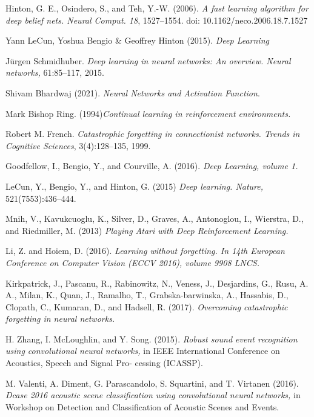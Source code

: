 \documentclass[english, LaM, oneside]{sapthesis}%
\begin{document}
\backmatter
{}
\begin{thebibliography}{17}

Hinton, G. E., Osindero, S., and Teh, Y.-W. (2006). \textit{A fast learning algorithm for deep belief nets. Neural Comput. 18}, 1527–1554. doi: 10.1162/neco.2006.18.7.1527

Yann LeCun, Yoshua Bengio & Geoffrey Hinton (2015). \textit{Deep Learning}

Jürgen Schmidhuber.  \textit{Deep learning in neural networks: An overview. Neural networks,} 61:85–117, 2015.

Shivam Bhardwaj (2021).  \textit{Neural Networks and Activation Function}.

Mark Bishop Ring. (1994)\textit{Continual learning in reinforcement environments.}

Robert M. French.  \textit{Catastrophic forgetting in connectionist networks. Trends in Cognitive Sciences}, 3(4):128–135, 1999.

Goodfellow, I., Bengio, Y., and Courville, A. (2016).  \textit{Deep Learning, volume 1.}

LeCun, Y., Bengio, Y., and Hinton, G. (2015)  \textit{Deep learning. Nature,} 521(7553):436–444.

Mnih, V., Kavukcuoglu, K., Silver, D., Graves, A., Antonoglou, I., Wierstra, D., and Riedmiller, M. (2013)  \textit{Playing Atari with Deep Reinforcement Learning.}
 
Li, Z. and Hoiem, D. (2016).  \textit{Learning without forgetting. In 14th European Conference on Computer Vision (ECCV 2016), volume 9908 LNCS.}

Kirkpatrick, J., Pascanu, R., Rabinowitz, N., Veness, J., Desjardins, G., Rusu, A. A., Milan, K., Quan, J., Ramalho, T., Grabska-barwinska, A., Hassabis, D., Clopath, C., Kumaran, D., and Hadsell, R. (2017). \textit{Overcoming catastrophic forgetting in neural networks.}

H. Zhang, I. McLoughlin, and Y. Song. (2015). \textit{Robust sound event recognition using convolutional neural networks,} in IEEE International Conference on Acoustics, Speech and Signal Pro- cessing (ICASSP).

 M. Valenti, A. Diment, G. Parascandolo, S. Squartini, and T. Virtanen (2016). \textit{Dcase 2016 acoustic scene classification using convolutional neural networks,} in Workshop on Detection and Classification of Acoustic Scenes and Events.


\end{thebibliography}
\end{document}
